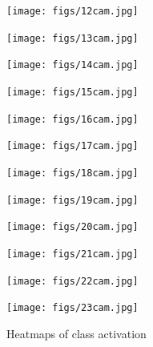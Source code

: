 \begin{figure}[H]

  \begin{minipage}[t]{.3\linewidth}
    \centering
    \texttt{[image: figs/12cam.jpg]}
    
  \end{minipage}
  \hfill
\begin{minipage}[t]{.3\linewidth}
    \centering
    \texttt{[image: figs/13cam.jpg]}
    
  \end{minipage}
  \hfill
  \begin{minipage}[t]{.3\linewidth}
    \centering
    \texttt{[image: figs/14cam.jpg]}
    
  \end{minipage}
  \hfill
  \begin{minipage}[t]{.3\linewidth}
    \centering
    \texttt{[image: figs/15cam.jpg]}
    
  \end{minipage}
  \hfill
  \begin{minipage}[t]{.3\linewidth}
    \centering
    \texttt{[image: figs/16cam.jpg]}
    
  \end{minipage}
  \hfill
\begin{minipage}[t]{.3\linewidth}
    \centering
    \texttt{[image: figs/17cam.jpg]}
   
  \end{minipage}
  \hfill
\begin{minipage}[t]{.3\linewidth}
    \centering
    \texttt{[image: figs/18cam.jpg]}
    
  \end{minipage}
  \hfill
\begin{minipage}[t]{.3\linewidth}
    \centering
    \texttt{[image: figs/19cam.jpg]}
    
  \end{minipage}
  \hfill
  \begin{minipage}[t]{.3\linewidth}
    \centering
    \texttt{[image: figs/20cam.jpg]}
    
  \end{minipage}
  \hfill
\begin{minipage}[t]{.3\linewidth}
    \centering
    \texttt{[image: figs/21cam.jpg]}
    
  \end{minipage}
  \hfill
\begin{minipage}[t]{.3\linewidth}
    \centering
    \texttt{[image: figs/22cam.jpg]}
    
  \end{minipage}
  \hfill
  \begin{minipage}[t]{.3\linewidth}
    \centering
    \texttt{[image: figs/23cam.jpg]}
    
  \end{minipage}
  \hfill
  \caption{Heatmaps of class activation}
  \vspace{-3mm}
  
\end{figure}

